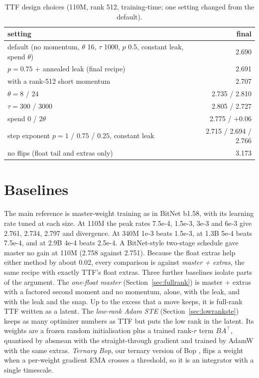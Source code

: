 \documentclass[10pt,twocolumn]{article}
\begin{document}
\begin{table}[t]
\centering
\caption{TTF design choices (110M, rank 512, training-time; one setting changed from the default).}
\label{tab:design}
\begin{tabular}{lr}
\toprule
setting & final \\
\midrule
default (no momentum, $\theta$ 16, $\tau$ 1000, $p$ 0.5, constant leak, spend $\theta$) & 2.690 \\
$p=0.75$ + annealed leak (final recipe) & 2.691 \\
with a rank-512 short momentum & 2.707 \\
$\theta=8$ / $24$ & 2.735 / 2.810 \\
$\tau=300$ / $3000$ & 2.805 / 2.727 \\
spend 0 / $2\theta$ & 2.775 / $+0.06$ \\
step exponent $p=1$ / $0.75$ / $0.25$, constant leak & 2.715 / 2.694 / 2.766 \\
no flips (float tail and extras only) & 3.173 \\
\bottomrule
\end{tabular}
\end{table}

\section{Baselines}\label{sec:baselines}
The main reference is master-weight training as in BitNet b1.58, with its learning rate tuned at each size. At 110M the peak
rates 7.5e-4, 1.5e-3, 3e-3 and 6e-3 give 2.761, 2.734, 2.797 and divergence. At 340M 1e-3 beats 1.5e-3, at 1.3B 5e-4
beats 7.5e-4, and at 2.9B 4e-4 beats 2.5e-4. A BitNet-style two-stage schedule gave master no gain at 110M (2.758 against 2.751). Because
the float extras help either method by about 0.02, every comparison is against \emph{master + extras}, the same recipe
with exactly TTF's float extras. Three further baselines isolate parts of the argument. The \emph{one-float master}
(Section~\ref{sec:fullrank}) is master + extras with a factored second moment and no momentum, alone, with the leak, and
with the leak and the snap. Up to the excess that a move keeps, it is full-rank TTF written as a latent. The
\emph{low-rank Adam STE} (Section~\ref{sec:lowrankste}) keeps as many optimizer numbers as TTF but puts the low rank in
the latent. Its weights are a frozen random initialisation plus a trained rank-$r$ term $BA^\top$, quantised by absmean
with the straight-through gradient and trained by AdamW with the same extras. \emph{Ternary Bop}, our ternary version of Bop
\citep{helwegen2019latent}, flips a weight when a per-weight gradient EMA crosses a threshold, so it is an integrator with
a single timescale.
\end{document}
